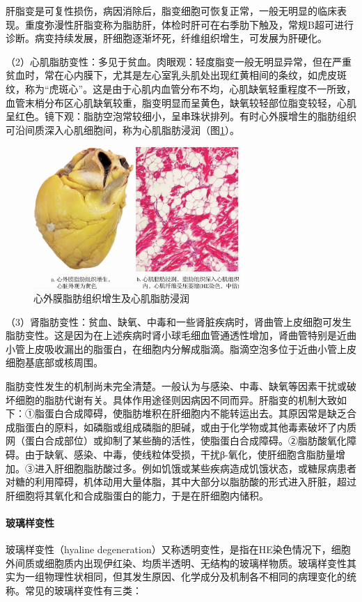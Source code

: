 肝脂变是可复性损伤，病因消除后，脂变细胞可恢复正常，一般无明显的临床表现。重度弥漫性肝脂变称为脂肪肝，体检时肝可在右季肋下触及，常规B超可进行诊断。病变持续发展，肝细胞逐渐坏死，纤维组织增生，可发展为肝硬化。

（2）心肌脂肪变性：多见于贫血。肉眼观：轻度脂变一般无明显异常，但在严重贫血时，常在心内膜下，尤其是左心室乳头肌处出现红黄相间的条纹，如虎皮斑纹，称为“虎斑心”。这是由于心肌内血管分布不均，心肌缺氧轻重程度不一所致，血管末梢分布区心肌缺氧较重，脂变明显而呈黄色，缺氧较轻部位脂变较轻，心肌呈红色。镜下观：脂肪空泡常较细小，呈串珠状排列。有时心外膜增生的脂肪组织可沿间质深入心肌细胞间，称为心肌脂肪浸润（图\ref{fig1-9}）。
\begin{figure}[!htbp]
	\centering
	\includegraphics[width=0.7\textwidth]{./images/Image00010.jpg}
	\caption{心外膜脂肪组织增生及心肌脂肪浸润}
	\label{fig1-9}
\end{figure}

（3）肾脂肪变性：贫血、缺氧、中毒和一些肾脏疾病时，肾曲管上皮细胞可发生脂肪变性。这是因为在上述疾病时肾小球毛细血管通透性增加，肾曲管特别是近曲小管上皮吸收漏出的脂蛋白，在细胞内分解成脂滴。脂滴空泡多位于近曲小管上皮细胞基底部或核周围。

脂肪变性发生的机制尚未完全清楚。一般认为与感染、中毒、缺氧等因素干扰或破坏细胞的脂肪代谢有关。具体作用途径则因病因不同而异。肝脂变的机制大致如下：①脂蛋白合成障碍，使脂肪堆积在肝细胞内不能转运出去。其原因常是缺乏合成脂蛋白的原料，如磷脂或组成磷脂的胆碱，或由于化学物或其他毒素破坏了内质网（蛋白合成部位）或抑制了某些酶的活性，使脂蛋白合成障碍。②脂肪酸氧化障碍。由于缺氧、感染、中毒，使线粒体受损，干扰β-氧化，使肝细胞含脂肪量增加。③进入肝细胞脂肪酸过多。例如饥饿或某些疾病造成饥饿状态，或糖尿病患者对糖的利用障碍，机体动用大量体脂，其中大部分以脂肪酸的形式进入肝脏，超过肝细胞将其氧化和合成脂蛋白的能力，于是在肝细胞内储积。

\paragraph{玻璃样变性}
玻璃样变性（hyaline
degeneration）又称透明变性，是指在HE染色情况下，细胞外间质或细胞质内出现伊红染、均质半透明、无结构的玻璃样物质。玻璃样变性其实为一组物理性状相同，但其发生原因、化学成分及机制各不相同的病理变化的统称。常见的玻璃样变性有三类：

